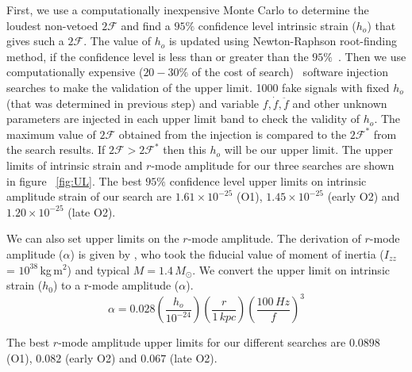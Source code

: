 \documentclass{ttuthes2007}
\begin{document}
First, we use a computationally inexpensive Monte Carlo to determine the loudest
non-vetoed $2\mathcal{F}$ and find a $95\%$ confidence level intrinsic strain
($h_o$) that gives such a $2\mathcal{F}$. The value of $h_o$ is updated using
Newton-Raphson root-finding method, if the
confidence level is less than or greater than the $95\%$~\cite{ Wette:2009uea}.
Then we use computationally expensive
($20- 30\%$ of the cost of search)~\cite{Aasi_2015} software injection searches
to make the validation of the upper limit. 1000 fake signals with fixed $h_o$
(that was determined in previous step) and variable $f,\dot{f},\ddot{f}$ and
other unknown parameters are injected in each upper limit band to check the
validity of $h_o$. The maximum value of $2\mathcal{F}$ obtained from the
injection is compared to the $2\mathcal{F}^*$ from the search results. If
$2\mathcal{F}> 2\mathcal{F}^*$ then this $h_o$ will be our upper limit.  The
upper limits of intrinsic strain and $r$-mode amplitude for our three searches
are
shown in figure ~\ref{fig:UL}.  The best $95\%$ confidence level upper limits on
intrinsic amplitude strain of our search are $1.61\times 10^{-25}$ (O1),
$1.45\times 10^{-25}$ (early O2) and $1.20\times 10^{-25}$ (late O2).

We can also set upper limits on the $r$-mode amplitude.  
The derivation of $r$-mode amplitude ($\alpha$) is given by \citet{Owen_2010},
who took the fiducial value of moment of inertia ($I_{zz}$ = $10^{38}$\,kg\,m$^2$)
and typical $M=1.4\,M_\odot$. We convert the upper limit on
intrinsic strain ($h_0$) to a r-mode amplitude ($\alpha$).   
\begin{equation} 
\alpha
=0.028\left(\frac{h_o}{10^{-24}}\right)\left(\frac{r}{1\,kpc}\right)\left(\frac{100\,Hz}{f}\right)^3
\end{equation} 

The best $r$-mode amplitude upper limits for our different searches are $0.0898$
(O1), $0.082$ (early O2) and $0.067$ (late O2). 
\end{document}
